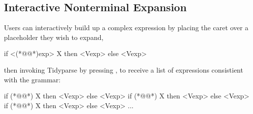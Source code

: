 \documentclass[sigplan,review,anonymous,acmsmall]{acmart}\settopmatter{printfolios=false,printccs=false,printacmref=false}
\begin{document}
    \subsection{Interactive Nonterminal Expansion}

    Users can interactively build up a complex expression by placing the caret over a placeholder they wish to expand,

\begin{tidyinput}
if <(*@@*)exp> X then <Vexp> else <Vexp>
\end{tidyinput}

    \noindent then invoking Tidyparse by pressing \keys{\ctrl + \SPACE}, to receive a list of expressions consistient with the grammar:

\begin{tidyoutput}
if (*@@*) X then <Vexp> else <Vexp>
if (*@@*) X then <Vexp> else <Vexp>
if (*@@*) X then <Vexp> else <Vexp>
...
\end{tidyoutput}

%
\end{document}
